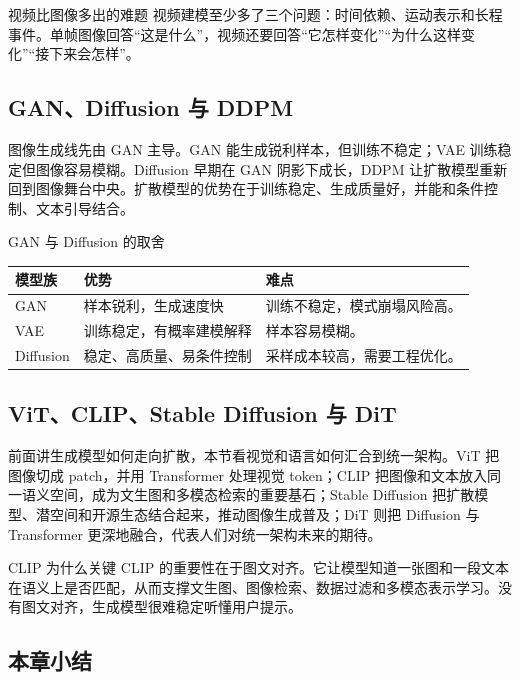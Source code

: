 \documentclass[a4paper]{article}
\begin{document}
\begin{importantbox}{视频比图像多出的难题}
视频建模至少多了三个问题：时间依赖、运动表示和长程事件。单帧图像回答“这是什么”，视频还要回答“它怎样变化”“为什么这样变化”“接下来会怎样”。
\end{importantbox}

\subsection{GAN、Diffusion 与 DDPM}

图像生成线先由 GAN 主导。GAN 能生成锐利样本，但训练不稳定；VAE 训练稳定但图像容易模糊。Diffusion 早期在 GAN 阴影下成长，DDPM 让扩散模型重新回到图像舞台中央。扩散模型的优势在于训练稳定、生成质量好，并能和条件控制、文本引导结合。

\begin{knowledgebox}{GAN 与 Diffusion 的取舍}
\begin{tabularx}{\textwidth}{p{}p{}X}
\toprule
模型族 & 优势 & 难点 \\
\midrule
GAN & 样本锐利，生成速度快 & 训练不稳定，模式崩塌风险高。 \\
VAE & 训练稳定，有概率建模解释 & 样本容易模糊。 \\
Diffusion & 稳定、高质量、易条件控制 & 采样成本较高，需要工程优化。 \\
\bottomrule
\end{tabularx}
\end{knowledgebox}

\subsection{ViT、CLIP、Stable Diffusion 与 DiT}

前面讲生成模型如何走向扩散，本节看视觉和语言如何汇合到统一架构。ViT 把图像切成 patch，并用 Transformer 处理视觉 token；CLIP 把图像和文本放入同一语义空间，成为文生图和多模态检索的重要基石；Stable Diffusion 把扩散模型、潜空间和开源生态结合起来，推动图像生成普及；DiT 则把 Diffusion 与 Transformer 更深地融合，代表人们对统一架构未来的期待。

\begin{importantbox}{CLIP 为什么关键}
CLIP 的重要性在于图文对齐。它让模型知道一张图和一段文本在语义上是否匹配，从而支撑文生图、图像检索、数据过滤和多模态表示学习。没有图文对齐，生成模型很难稳定听懂用户提示。
\end{importantbox}

\subsection{本章小结}
\end{document}
